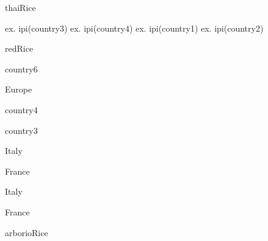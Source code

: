 \documentclass[a4paper,portrait,12pt]{article}
\begin{document}
\begin{flushleft}
thaiRice
\end{flushleft}


\begin{flushleft}
ex. ipi(country3) ex. ipi(country4) ex. ipi(country1) ex. ipi(country2)
\end{flushleft}


\begin{flushleft}
redRice
\end{flushleft}





\begin{flushleft}
country6
\end{flushleft}


\begin{flushleft}
Europe
\end{flushleft}





\begin{flushleft}
country4
\end{flushleft}





\begin{flushleft}
country3
\end{flushleft}





\begin{flushleft}
Italy
\end{flushleft}





\begin{flushleft}
France
\end{flushleft}





\begin{flushleft}
Italy
\end{flushleft}





\begin{flushleft}
France
\end{flushleft}





\begin{flushleft}
arborioRice
\end{flushleft}
\end{document}
